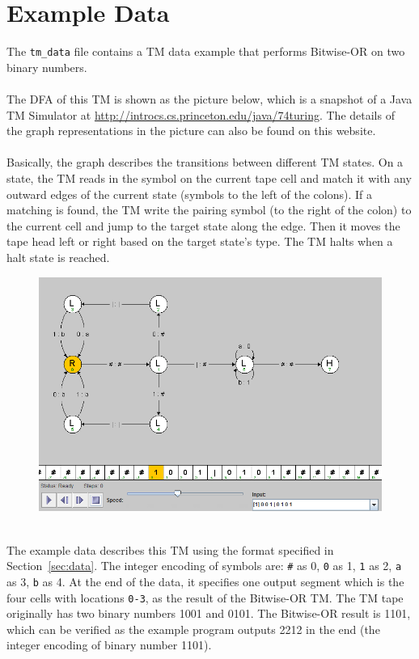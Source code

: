 \documentclass[11pt]{article}
\begin{document}
\section{Example Data}
\label{sec:example}
The {\tt tm\_data} file contains a TM data example that performs Bitwise-OR on two binary numbers.\\\\
The DFA of this TM is shown as the picture below, which is a snapshot of a Java TM Simulator at \url{http://introcs.cs.princeton.edu/java/74turing}. The details of the graph representations in the picture can also be found on this website. \\
\\
Basically, the graph describes the transitions between different TM states. On a state, the TM reads in the symbol on the current tape cell and match it with any outward edges of the current state (symbols to the left of the colons). If a matching is found, the TM write the pairing symbol (to the right of the colon) to the current cell and jump to the target state along the edge. Then it moves the tape head left or right based on the target state's type. The TM halts when a halt state is reached.\\
\begin{figure}[hp]
\includegraphics[width=\textwidth]{tm_bitwise_or}
\end{figure}
\\
The example data describes this TM using the format specified in Section~\ref{sec:data}. The integer encoding of symbols are: {\tt \#} as 0, {\tt 0} as 1, {\tt 1} as 2, {\tt a} as 3, {\tt b} as 4. At the end of the data, it specifies one output segment which is the four cells with locations {\tt 0-3}, as the result of the Bitwise-OR TM. The TM tape originally has two binary numbers 1001 and 0101. The Bitwise-OR result is 1101, which can be verified as the example program outputs 2212 in the end (the integer encoding of binary number 1101).
\end{document}
